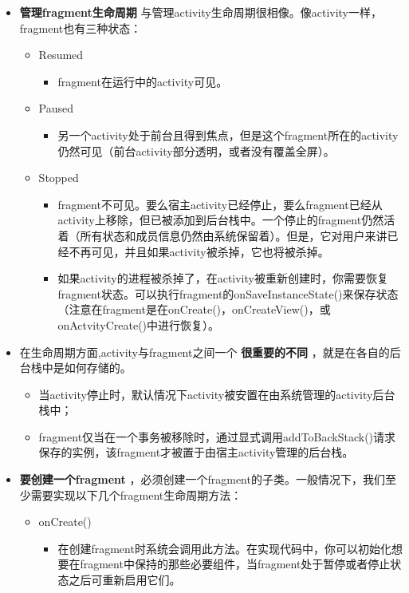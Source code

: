 \documentclass[9pt, b5paper]{article}
\begin{document}
\begin{itemize}
\item \textbf{管理fragment生命周期} 与管理activity生命周期很相像。像activity一样，fragment也有三种状态：
\begin{itemize}
\item Resumed
\begin{itemize}
\item fragment在运行中的activity可见。
\end{itemize}
\item Paused
\begin{itemize}
\item 另一个activity处于前台且得到焦点，但是这个fragment所在的activity仍然可见（前台activity部分透明，或者没有覆盖全屏）。
\end{itemize}
\item Stopped
\begin{itemize}
\item fragment不可见。要么宿主activity已经停止，要么fragment已经从activity上移除，但已被添加到后台栈中。一个停止的fragment仍然活着（所有状态和成员信息仍然由系统保留着）。但是，它对用户来讲已经不再可见，并且如果activity被杀掉，它也将被杀掉。
\item 如果activity的进程被杀掉了，在activity被重新创建时，你需要恢复fragment状态。可以执行fragment的onSaveInstanceState()来保存状态（注意在fragment是在onCreate()，onCreateView()，或onActvityCreate()中进行恢复）。
\end{itemize}
\end{itemize}
\item 在生命周期方面,activity与fragment之间一个 \textbf{很重要的不同} ，就是在各自的后台栈中是如何存储的。
\begin{itemize}
\item 当activity停止时，默认情况下activity被安置在由系统管理的activity后台栈中；　
\item fragment仅当在一个事务被移除时，通过显式调用addToBackStack()请求保存的实例，该fragment才被置于由宿主activity管理的后台栈。　
\end{itemize}
\item \textbf{要创建一个fragment} ，必须创建一个fragment的子类。一般情况下，我们至少需要实现以下几个fragment生命周期方法：
\begin{itemize}
\item onCreate()
\begin{itemize}
\item 在创建fragment时系统会调用此方法。在实现代码中，你可以初始化想要在fragment中保持的那些必要组件，当fragment处于暂停或者停止状态之后可重新启用它们。

\end{itemize}
\end{itemize}
\end{itemize}
\end{document}

